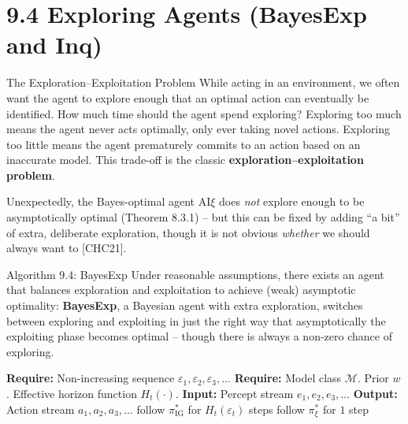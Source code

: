 \documentclass[aspectratio=169,10pt]{beamer}
\newcommand{\IG}{\mathrm{IG}}
\begin{document}
\section{9.4 Exploring Agents (BayesExp and Inq)}

\begin{frame}{The Exploration--Exploitation Problem}
  While acting in an environment, we often want the agent to explore
  enough that an optimal action can eventually be identified. How much
  time should the agent spend exploring? Exploring too much means the
  agent never acts optimally, only ever taking novel actions. Exploring
  too little means the agent prematurely commits to an action based on an
  inaccurate model. This trade-off is the classic
  \textbf{exploration--exploitation problem}.

  \vspace{0.4em}
  Unexpectedly, the Bayes-optimal agent $\mathrm{AI}\xi$ does \emph{not}
  explore enough to be asymptotically optimal (Theorem 8.3.1) -- but this
  can be fixed by adding ``a bit'' of extra, deliberate exploration, though
  it is not obvious \emph{whether} we should always want to [CHC21].
\end{frame}

\begin{frame}{Algorithm 9.4: BayesExp}
  Under reasonable assumptions, there exists an agent that balances
  exploration and exploitation to achieve (weak) asymptotic optimality:
  \textbf{BayesExp}, a Bayesian agent with extra exploration, switches
  between exploring and exploiting in just the right way that asymptotically
  the exploiting phase becomes optimal -- though there is always a non-zero
  chance of exploring.

  {\small
  \begin{algorithmic}[1]
    \Statex \textbf{Require:} Non-increasing sequence $\varepsilon_1,\varepsilon_2,\varepsilon_3,\dots$
    \Statex \textbf{Require:} Model class $\mathcal{M}$. Prior $w$. Effective horizon function $H_t(\cdot)$.
    \Statex \textbf{Input:} Percept stream $e_1,e_2,e_3,\dots$
    \Statex \textbf{Output:} Action stream $a_1,a_2,a_3,\dots$
      \If{$V^{*,\,t+H_t(\varepsilon_t)}_{\IG}(h_{<t}) > \varepsilon_t$}
        \State follow $\pi^*_{\IG}$ for $H_t(\varepsilon_t)$ steps 
      \Else
        \State follow $\pi^*_\xi$ for $1$ step 
      \EndIf
    \EndWhile
  \end{algorithmic}}
\end{frame}
\end{document}
